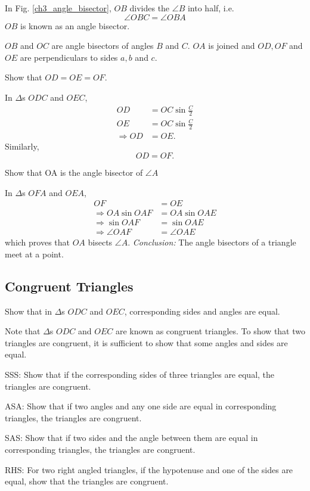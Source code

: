 \begin{definition}
	In Fig. \ref{ch3_angle_bisector}, $OB$ divides the  $\angle B$ into half, i.e.\begin{equation}
	\angle OBC = \angle OBA
	\end{equation}
	$OB$ is known as an angle bisector.
\end{definition}
	$OB$ and $OC$ are angle bisectors of angles $B$ and $C$. $OA$ is joined and $OD, OF$ and $OE$ are perpendiculars to sides $a,b$ and $c$.
\begin{problem}
  Show that $OD = OE = OF$.
\end{problem}
\proof In $\Delta$s $ODC$ and $OEC$,
\begin{align}
OD &= OC \sin \frac{C}{2}
\\
OE &= OC \sin \frac{C}{2} 
\\
\Rightarrow OD &=OE.
\end{align}
Similarly,
\begin{equation}
OD = OF.
\end{equation}
%
\begin{problem}
	Show that OA is the angle bisector of $\angle A$
\end{problem}
\proof In $\Delta$s $OFA$ and $OEA$,
\begin{align}
OF &= OE
\\
\Rightarrow OA \sin OAF &= OA \sin OAE \\
\Rightarrow \sin OAF &=  \sin OAE \\
\Rightarrow \angle OAF &= \angle OAE
\end{align}
which proves that $OA$ bisects $\angle A$.
{\em Conclusion:} The angle bisectors of a triangle meet at a point.


\subsection{Congruent Triangles}
%
\begin{problem}
	Show that in $\Delta$s $ODC$ and $OEC$, corresponding sides and angles are equal.
\end{problem}
\begin{definition}
	Note that    $\Delta$s $ODC$ and $OEC$ are known as congruent triangles.  To show that two triangles are congruent, it is sufficient to show that some angles and sides are equal.
\end{definition}
\begin{problem}
SSS:	Show that if the corresponding sides of three triangles are equal, the triangles are congruent.
\end{problem}
\begin{problem}
ASA:	Show that if two angles and any one side  are equal in corresponding triangles, the triangles are congruent.
\end{problem}
\begin{problem}
SAS:	Show that if two sides and the angle between them are equal in corresponding triangles, the triangles are congruent.
\end{problem}
\begin{problem}
RHS:	For two right angled triangles, if the hypotenuse and one of the sides are equal, show that the triangles are congruent.
\end{problem}
%
